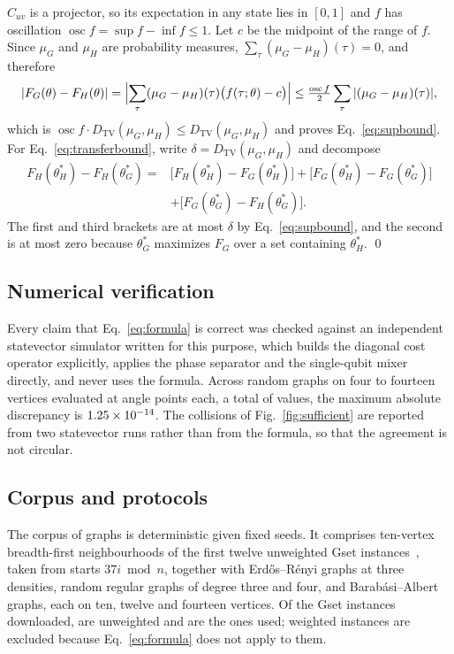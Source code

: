 \documentclass[10pt,letterpaper]{article}
\theoremstyle{definition}
\newcommand{\Dtv}{D_{\mathrm{TV}}}
\begin{document}
$C_{uv}$ is a projector, so its expectation in any state lies in $[0,1]$ and
$f$ has oscillation $\operatorname{osc}f=\sup f-\inf f\le1$. Let $c$ be the
midpoint of the range of $f$. Since $\mu_G$ and $\mu_H$ are probability
measures, $\sum_\tau(\mu_G-\mu_H)(\tau)=0$, and therefore
\begin{equation}
 |F_G(\theta)-F_H(\theta)|
 =\Bigl|\sum_\tau(\mu_G-\mu_H)(\tau)\bigl(f(\tau;\theta)-c\bigr)\Bigr|
 \le\tfrac{\operatorname{osc}f}{2}\sum_\tau|(\mu_G-\mu_H)(\tau)|,
\end{equation}
which is $\operatorname{osc}f\cdot\Dtv(\mu_G,\mu_H)\le\Dtv(\mu_G,\mu_H)$ and
proves Eq.~\eqref{eq:supbound}. For Eq.~\eqref{eq:transferbound}, write
$\delta=\Dtv(\mu_G,\mu_H)$ and decompose
\begin{align}
 F_H(\theta^*_H)-F_H(\theta^*_G)
 ={}&\bigl[F_H(\theta^*_H)-F_G(\theta^*_H)\bigr]
 +\bigl[F_G(\theta^*_H)-F_G(\theta^*_G)\bigr]\nonumber\\
 &+\bigl[F_G(\theta^*_G)-F_H(\theta^*_G)\bigr].
\end{align}
The first and third brackets are at most $\delta$ by Eq.~\eqref{eq:supbound},
and the second is at most zero because $\theta^*_G$ maximizes $F_G$ over a set
containing $\theta^*_H$. \qed

\subsection{Numerical verification}

Every claim that Eq.~\eqref{eq:formula} is correct was checked against an
independent statevector simulator written for this purpose, which builds the
diagonal cost operator explicitly, applies the phase separator and the
single-qubit mixer directly, and never uses the formula. Across \VerGraphs{}
random graphs on four to fourteen vertices evaluated at \AnglePoints{} angle
points each, a total of \VerValues{} values, the maximum absolute discrepancy is
$1.25\times10^{-14}$. The collisions of Fig.~\ref{fig:sufficient} are reported from two
statevector runs rather than from the formula, so that the agreement is not
circular.

\subsection{Corpus and protocols}

The corpus of \CorpusSize{} graphs is deterministic given fixed seeds. It
comprises ten-vertex breadth-first neighbourhoods of the first twelve
unweighted Gset instances~\cite{gset}, taken from starts $37i \bmod n$, together
with \mbox{Erd\H{o}s--R\'enyi} graphs at three densities, random regular graphs
of degree three and four, and Barab\'asi--Albert graphs, each on ten, twelve and
fourteen vertices. Of the Gset instances downloaded, \NGset{} are unweighted and
are the ones used; weighted instances are excluded because
Eq.~\eqref{eq:formula} does not apply to them.
\end{document}

